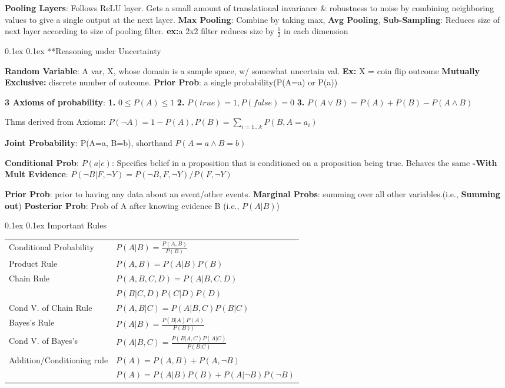 \documentclass[10pt,landscape]{article}
\makeatletter
\renewcommand{\section}{\@startsection{section}{1}{0mm}%
                                {0.1ex}%
                                {0.1ex}%
                                {\normalfont\normalsize\bfseries}}
\renewcommand{\subsection}{\@startsection{subsection}{2}{0mm}%
                                {0.1ex}%
                                {0.1ex}%
                                {\normalfont\footnotesize\bfseries}}
\makeatother
\begin{document}
\begin{multicols}{3}
\textbf{Pooling Layers}: Follows ReLU layer.  Gets a small amount of translational invariance \& robustness to noise by combining  neighboring values to give a single output at the next layer. \textbf{Max Pooling}: Combine by taking max, \textbf{Avg Pooling}, \textbf{Sub-Sampling}: Reduces size of next layer according to size of pooling filter. \textbf{ex:}a 2x2 filter reduces size by $\frac{1}{2}$ in each dimension

\section{**Reasoning under Uncertainty}

\textbf{Random Variable}: A var, X, whose domain is a sample space, w/ somewhat uncertain val.  \textbf{Ex:} X = coin flip outcome \textbf{Mutually Exclusive:} discrete number of outcome. \textbf{Prior Prob}: a single probability(P(A=a) or P(a))

\textbf{3 Axioms of probability}: \textbf{1.} $0 \le P(A) \le 1$ \textbf{2.} $P(true)=1,P(false)=0$ \textbf{3.} $P(A\lor B)=P(A)+P(B) - P(A\land B)$

Thms derived from Axioms: $P(\neg A)=1-P(A), P(B)=\sum_{i=1...k}P(B,A=a_i)$

\textbf{Joint Probability}: P(A=a, B=b), shorthand $P(A=a\land B=b)$

\textbf{Conditional Prob}: $P(a | e)$: Specifies belief in a proposition that is conditioned on a proposition being true. Behaves the same
\textbf{-With Mult Evidence}: $P(\neg B|F, \neg Y)=P(\neg B, F, \neg Y) / P(F,\neg Y)$

\textbf{Prior Prob}: prior to having any data about an event/other events. 
\textbf{Marginal Probs}: summing over all other variables.(i.e., \textbf{Summing out})
\textbf{Posterior Prob}: Prob of A after knowing evidence B (i.e., $P(A|B)$)


\subsection{Important Rules}
\begin{tabular}{ll}
Conditional Probability&$P(A|B)=\frac{P(A,B)}{P(B)}$\\
Product Rule&$P(A,B)=P(A|B)P(B)$\\
Chain Rule&$P(A,B,C,D)=P(A|B,C,D)$\\&$P(B|C,D)P(C|D)P(D)$\\
Cond V. of Chain Rule&$P(A,B|C)=P(A|B,C)P(B|C)$\\
Bayes's Rule&$P(A|B)=\frac{P(B|A)P(A)}{P(B))}$\\
Cond V. of Bayes's&$P(A|B,C)=\frac{P(B|A,C)P(A|C)}{P(B|C)}$\\
Addition/Conditioning rule&$P(A)=P(A,B)+P(A,\neg B)$\\&\tiny{$P(A)=P(A|B)P(B)+P(A|\neg B)P(\neg B)$}\\
\end{tabular}


\end{multicols}
\end{document}
